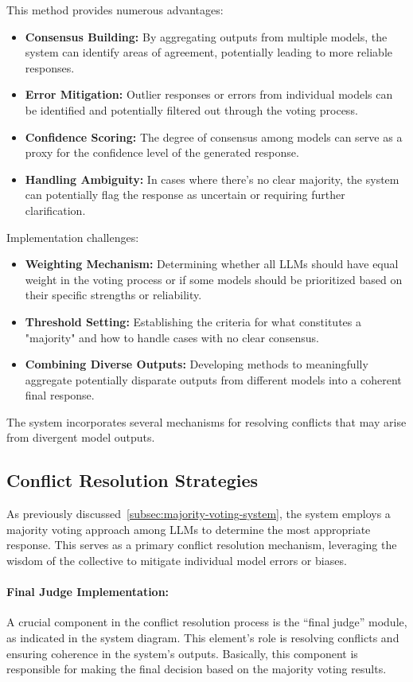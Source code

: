 This method provides numerous advantages:
\begin{itemize}
    \item \textbf{Consensus Building:} By aggregating outputs from multiple models, the system can identify areas of agreement, potentially leading to more reliable responses.
    \item \textbf{Error Mitigation:} Outlier responses or errors from individual models can be identified and potentially filtered out through the voting process.
    \item \textbf{Confidence Scoring:} The degree of consensus among models can serve as a proxy for the confidence level of the generated response.
    \item \textbf{Handling Ambiguity:} In cases where there's no clear majority, the system can potentially flag the response as uncertain or requiring further clarification.
\end{itemize}

Implementation challenges:
\begin{itemize}
    \item \textbf{Weighting Mechanism:} Determining whether all LLMs should have equal weight in the voting process or if some models should be prioritized based on their specific strengths or reliability.
    \item \textbf{Threshold Setting:} Establishing the criteria for what constitutes a "majority" and how to handle cases with no clear consensus.
    \item \textbf{Combining Diverse Outputs:} Developing methods to meaningfully aggregate potentially disparate outputs from different models into a coherent final response.
\end{itemize}
The system incorporates several mechanisms for resolving conflicts that may arise from divergent model outputs.

\subsection{Conflict Resolution Strategies}\label{subsec:conflict-resolution-strategies}
As previously discussed~\ref{subsec:majority-voting-system}, the system employs a majority voting approach among LLMs to determine the most appropriate response.
This serves as a primary conflict resolution mechanism, leveraging the wisdom of the collective to mitigate individual model errors or biases.

\paragraph{Final Judge Implementation:}
A crucial component in the conflict resolution process is the ``final judge'' module, as indicated in the system diagram.
This element's role is resolving conflicts and ensuring coherence in the system's outputs.
Basically, this component is responsible for making the final decision based on the majority voting results.

